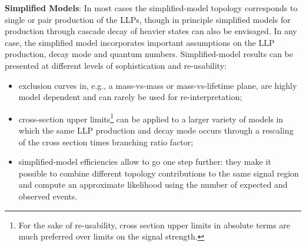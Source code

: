 {\bf Simplified Models}: %
In most cases the simplified-model topology corresponds to single or pair
production of the LLPs, though in principle simplified models for production
through cascade decay of heavier states can also be envisaged. 
In any case, the simplified model incorporates important assumptions 
on the LLP production, decay mode and quantum numbers. 
Simplified-model results can be presented at different levels of sophistication and re-usability:
\begin{itemize}
\item exclusion curves in, e.g., a mass-vs-mass or mass-vs-lifetime plane, are highly model dependent and can 
rarely be used for re-interpretation;
\item cross-section upper limits\footnote{For the sake of re-usability, cross section upper limits in absolute terms are much preferred over limits on the signal strength.} 
can be applied to a larger variety of models
in which the same LLP production and decay mode occurs 
through a rescaling of the cross section times branching 
ratio factor; 
\item simplified-model efficiencies allow to go one step further: they make
it possible to combine different topology contributions to the same signal
region and compute an approximate likelihood using the number of expected and
observed events.
\end{itemize} 

